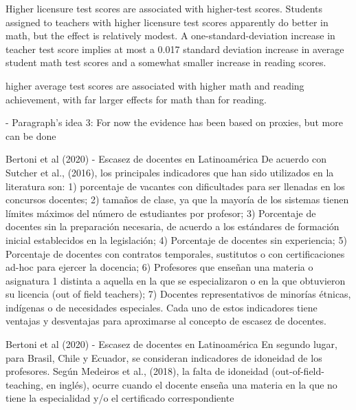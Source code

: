 Higher licensure test scores are associated with higher-test scores. Students assigned to teachers with higher licensure test scores apparently do better in math, but the effect is relatively modest. A one-standard-deviation increase in teacher test score implies at most a 0.017 standard deviation increase in average student math test scores and a somewhat smaller increase in reading scores. \citep{Clotfelter_et_al_2006}

higher average test scores are associated with higher math and reading achievement, with far larger effects for math than for reading. \citep{Clotfelter_et_al_2007}





- Paragraph's idea 3: For now the evidence has been based on proxies, but more can be done

Bertoni et al (2020) - Escasez de docentes en Latinoamérica
De acuerdo con Sutcher et al., (2016), los principales indicadores que han sido utilizados en la literatura son: 1) porcentaje de vacantes con dificultades para ser llenadas en los concursos docentes; 2) tamaños de clase, ya que la mayoría de los sistemas tienen límites máximos del número de estudiantes por profesor; 3) Porcentaje de docentes sin la preparación necesaria, de acuerdo a los estándares de formación inicial establecidos en la legislación; 4) Porcentaje de docentes sin experiencia; 5) Porcentaje de docentes con contratos temporales, sustitutos o con certificaciones ad-hoc para ejercer la docencia; 6) Profesores que enseñan una materia o asignatura 1 distinta a aquella en la que se especializaron o en la que obtuvieron su licencia (out of field teachers); 7) Docentes representativos de minorías étnicas, indígenas o de necesidades especiales. Cada uno de estos indicadores tiene ventajas y desventajas para aproximarse al concepto de escasez de docentes.

Bertoni et al (2020) - Escasez de docentes en Latinoamérica
En segundo lugar, para Brasil, Chile y Ecuador, se consideran indicadores de idoneidad de los profesores. Según Medeiros et al., (2018), la falta de idoneidad (out-of-field-teaching, en inglés), ocurre cuando el docente enseña una materia en la que no tiene la especialidad y/o el certificado correspondiente

